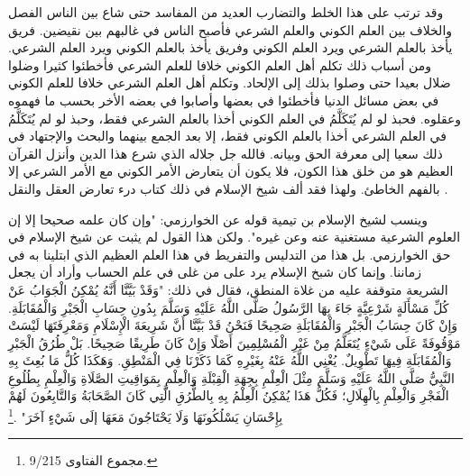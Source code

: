 وقد ترتب على هذا الخلط والتضارب العديد من المفاسد حتى شاع بين الناس الفصل والخلاف بين العلم الكوني والعلم الشرعي فأصبح الناس في غالبهم بين نقيضين. فريق يأخذ بالعلم الشرعي ويرد العلم الكوني وفريق يأخذ بالعلم الكوني ويرد العلم الشرعي. ومن أسباب ذلك تكلم أهل العلم الكوني خلافا للعلم الشرعي فأخطئوا كثيرا وضلوا ضلال بعيدا حتى وصلوا بذلك إلى الإلحاد. وتكلم أهل العلم الشرعي خلافا للعلم الكوني في بعض مسائل الدنيا فأخطئوا في بعضها وأصابوا في بعضه الأخر بحسب ما فهموه وعقلوه. فحبذ لو لم يُتَكَلَّمُ في العلم الكوني أخذا بالعلم الشرعي فقط، وحبذ لو لم يُتَكَلَّمُ في العلم الشرعي أخذا بالعلم الكوني فقط، إلا بعد الجمع بينهما والبحث والإجتهاد في ذلك سعيا إلى معرفة الحق وبيانه. فالله جل جلاله الذي شرع هذا الدين وأنزل القرآن العظيم هو من خلق هذا الكون، فلا يكون أن يتعارض الأمر الكوني مع الأمر الشرعي إلا بالفهم الخاطئ. ولهذا فقد ألف شيخ الإسلام في ذلك كتاب درء تعارض العقل والنقل \cite{ibnTaimia_DTAWN}.

وينسب لشيخ الإسلام بن تيمية قوله عن الخوارزمي: "وإن كان علمه صحيحا إلا إن العلوم الشرعية مستغنية عنه وعن غيره". ولكن هذا القول لم يثبت عن شيخ الإسلام في حق الخوارزمي. بل هذا من التدليس والتفريط في هذا العلم العظيم الذي ابتلينا به في زماننا. وإنما كان شبخ الإسلام يرد على من غلى في علم الحساب وأراد أن يجعل الشريعة متوقفة عليه من غلاة المنطق، فقال في ذلك: "وَقَدْ بَيَّنَّا أَنَّهُ يُمْكِنُ الْجَوَابُ عَنْ كُلِّ مَسْأَلَةٍ شَرْعِيَّةٍ جَاءَ بِهَا الرَّسُولُ صَلَّى اللَّهُ عَلَيْهِ وَسَلَّمَ بِدُونِ حِسَابِ الْجَبْرِ وَالْمُقَابَلَةِ. وَإِنْ كَانَ حِسَابُ الْجَبْرِ وَالْمُقَابَلَةِ صَحِيحًا فَنَحْنُ قَدْ بَيَّنَّا أَنَّ شَرِيعَةَ الْإِسْلَامِ وَمَعْرِفَتَهَا لَيْسَتْ مَوْقُوفَةً عَلَى شَيْءٍ يُتَعَلَّمُ مِنْ غَيْرِ الْمُسْلِمِينَ أَصْلًا وَإِنْ كَانَ طَرِيقًا صَحِيحًا. بَلْ طُرُقُ الْجَبْرِ وَالْمُقَابَلَةِ فِيهَا تَطْوِيلٌ. يُغْنِي اللَّهُ عَنْهُ بِغَيْرِهِ كَمَا ذَكَرْنَا فِي الْمَنْطِقِ. وَهَكَذَا كُلُّ مَا بُعِثَ بِهِ النَّبِيُّ صَلَّى اللَّهُ عَلَيْهِ وَسَلَّمَ مِثْلَ الْعِلْمِ بِجِهَةِ الْقِبْلَةِ وَالْعِلْمِ بِمَوَاقِيتِ الصَّلَاةِ وَالْعِلْمِ بِطُلُوعِ الْفَجْرِ وَالْعِلْمِ بِالْهِلَالِ؛ فَكُلُّ هَذَا يُمْكِنُ الْعِلْمُ بِهِ بِالطُّرُقِ الَّتِي كَانَ الصَّحَابَةُ وَالتَّابِعُونَ لَهُمْ بِإِحْسَانِ يَسْلُكُونَهَا وَلَا يَحْتَاجُونَ مَعَهَا إلَى شَيْءٍ آخَرَ" \href{https://shamela.ws/book/7289/4480#p1}{\faExternalLink} \cite{ibnTaimia_Majmoo}.\footnote{مجموع الفتاوى 9/215.}

